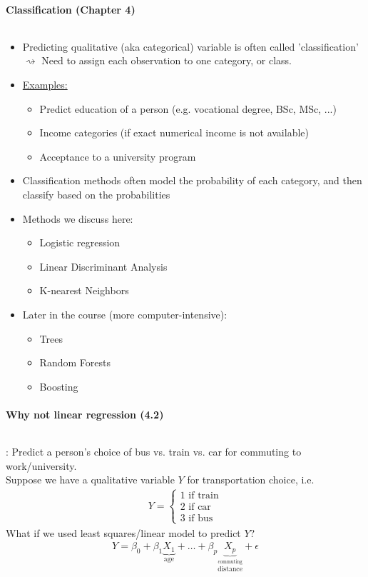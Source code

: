 \documentclass[11pt,a4paper,numbers=endperiod]{scrartcl}
\newcommand{\id}{\hspace*{4mm}}
\newcommand{\tit}[1]{\begin{large} \underline{\text{#1}}\end{large}}
\begin{document}
{\paragraph{Classification (Chapter 4)}
$ $\\
\begin{itemize}
	\item Predicting qualitative (aka categorical) variable is often called 'classification' $\rightsquigarrow$ Need to assign each observation to one category, or class. 
	\item  \underline{Examples:} \begin{itemize}
		\item Predict education of a person (e.g. vocational degree, BSc, MSc, ...) 
		\item Income categories (if exact numerical income is not available) 
		\item Acceptance to a university program
	\end{itemize}
	\item Classification methods often model the probability of each category, and then classify based on the probabilities
	\item Methods we discuss here: \begin{itemize}
		\item Logistic regression
		\item Linear Discriminant Analysis
		\item K-nearest Neighbors
	\end{itemize}
	\item Later in the course (more computer-intensive): \begin{itemize}
		\item Trees
		\item Random Forests
		\item Boosting 
	\end{itemize}
\end{itemize}

\paragraph{Why not linear regression (4.2)}
$ $\\

\tit{Example}: Predict a person's choice of bus vs. train vs. car for commuting to work/university.\\
\id Suppose we have a qualitative variable $Y$ for transportation choice, i.e. \begin{align*}
	Y = \begin{cases}
	1 \text{ if train}\\
	2 \text{ if car}\\
	3 \text{ if bus}
	\end{cases}
\end{align*}
\id What if we used least squares/linear model to predict $Y$? \begin{align*}
	Y = \beta_0 + \beta_1\underbrace{X_1}_{\text{age}} + \ldots + \beta_p\underbrace{X_p}_{\stackrel{\text{commuting}}{\text{distance}}}  + \epsilon
\end{align*}

}
\end{document}
